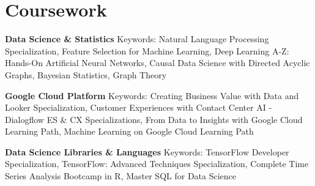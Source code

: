 \documentclass[a4paper,9pt]{extarticle}
\begin{document}
\section*{Coursework}

\noindent
\textbf{Data Science \& Statistics}
Keywords: Natural Language Processing Specialization, Feature Selection for Machine Learning, Deep Learning A-Z: Hands-On Artificial Neural Networks, Causal Data Science with Directed Acyclic Graphs, Bayesian Statistics, Graph Theory

\noindent
\textbf{Google Cloud Platform}
Keywords: Creating Business Value with Data and Looker Specialization, Customer Experiences with Contact Center AI - Dialogflow ES \& CX Specializations, From Data to Insights with Google Cloud Learning Path, Machine Learning on Google Cloud Learning Path

\noindent
\textbf{Data Science Libraries \& Languages}
Keywords: TensorFlow Developer Specialization, TensorFlow: Advanced Techniques Specialization, Complete Time Series Analysis Bootcamp in R, Master SQL for Data Science
\end{document}

